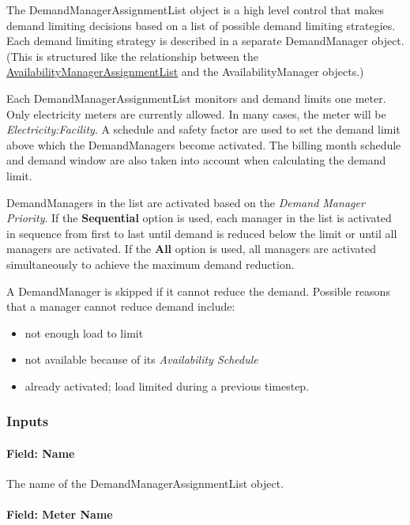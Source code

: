 The DemandManagerAssignmentList object is a high level control that makes demand limiting decisions based on a list of possible demand limiting strategies. Each demand limiting strategy is described in a separate DemandManager object. (This is structured like the relationship between the \hyperref[availabilitymanagerassignmentlist]{AvailabilityManagerAssignmentList} and the AvailabilityManager objects.)

Each DemandManagerAssignmentList monitors and demand limits one meter. Only electricity meters are currently allowed. In many cases, the meter will be \emph{Electricity:Facility}. A schedule and safety factor are used to set the demand limit above which the DemandManagers become activated. The billing month schedule and demand window are also taken into account when calculating the demand limit.

DemandManagers in the list are activated based on the \emph{Demand Manager Priority}. If the \textbf{Sequential} option is used, each manager in the list is activated in sequence from first to last until demand is reduced below the limit or until all managers are activated. If the \textbf{All} option is used, all managers are activated simultaneously to achieve the maximum demand reduction.

A DemandManager is skipped if it cannot reduce the demand. Possible reasons that a manager cannot reduce demand include:

\begin{itemize}
\item
  not enough load to limit
\item
  not available because of its \emph{Availability Schedule}
\item
  already activated; load limited during a previous timestep.
\end{itemize}

\subsubsection{Inputs}\label{inputs-010}

\paragraph{Field: Name}\label{field-name-009}

The name of the DemandManagerAssignmentList object.

\paragraph{Field: Meter Name}\label{field-meter-name}

